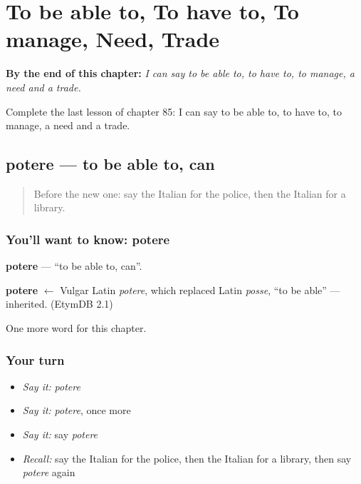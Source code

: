
\chapter{To be able to, To have to, To manage, Need, Trade}
\label{ch:it-to-be-able-to-to-have-to-to-manage-need-trade}

\begin{chapteropening}
\textbf{By the end of this chapter:} \emph{I can say to be able to, to have to, to manage, a need and a trade.}

Complete the last lesson of chapter 85: I can say to be able to, to have to, to manage, a need and a trade.
\end{chapteropening}

\section[potere]{potere — to be able to, can}

\label{lesson:IT-C85-potere}



\begin{quote}
Before the new one: say the Italian for the police, then the Italian for a library.
\end{quote}

\subsection*{You'll want to know: potere}
\textbf{potere} — \textquotedblleft{}to be able to, can\textquotedblright{}.

\begin{cousinweb}
\textbf{potere} $\leftarrow$ Vulgar Latin \emph{potere}, which replaced Latin \emph{posse}, \textquotedblleft{}to be able\textquotedblright{} — inherited. (EtymDB 2.1)
\end{cousinweb}

\begin{grammarlens}[title={What you've built}]
One more word for this chapter.
\end{grammarlens}

\subsection*{Your turn}
\begin{itemize}
\raggedright
  \item \emph{Say it:} \emph{potere}
  \item \emph{Say it:} \emph{potere}, once more
  \item \emph{Say it:} say \emph{potere}
  \item \emph{Recall:} say the Italian for the police, then the Italian for a library, then say \emph{potere} again
\end{itemize}

